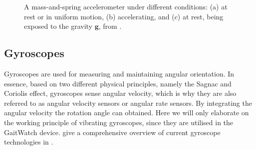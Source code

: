 \begin{figure}
\centering
{}
\caption{A mass-and-spring accelerometer under different conditions: (a) at rest or in uniform motion, (b) accelerating, and (c) at rest, being exposed to the gravity $\mathbf{g}$, from \cite{bhattacharyya_inertial_sensors_applications_13}.}
	\label{fig:accelerometer}
\end{figure}


\subsection{Gyroscopes}

Gyroscopes are used for measuring and maintaining angular orientation. In essence, based on two different physical principles, namely the Sagnac and Coriolis effect, gyroscopes sense angular velocity, which is why they are also referred to as angular velocity sensors or angular rate sensors. By integrating the angular velocity the rotation angle can obtained. Here we will only elaborate on the working principle of vibrating gyroscopes, since they are utilised in the GaitWatch device. \citeauthor{armenise2010advances} give a comprehensive overview of current gyroscope technologies in \cite{armenise2010advances}.

